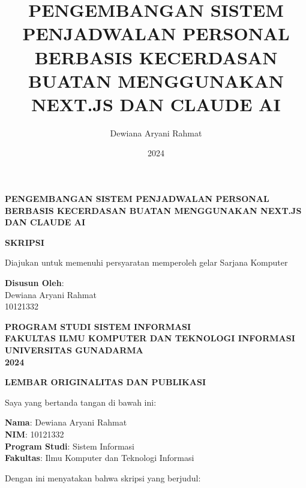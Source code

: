 \documentclass[12pt,a4paper,oneside]{report}
\title{PENGEMBANGAN SISTEM PENJADWALAN PERSONAL BERBASIS KECERDASAN BUATAN MENGGUNAKAN NEXT.JS DAN CLAUDE AI}
\author{Dewiana Aryani Rahmat}
\date{2024}
\begin{document}
\begin{titlepage}
\centering
\vspace*{2cm}

{\LARGE\bfseries PENGEMBANGAN SISTEM PENJADWALAN PERSONAL BERBASIS KECERDASAN BUATAN MENGGUNAKAN NEXT.JS DAN CLAUDE AI}

\vspace{2cm}

{\Large\bfseries SKRIPSI}

\vspace{1cm}

Diajukan untuk memenuhi persyaratan memperoleh gelar Sarjana Komputer

\vspace{3cm}

{\Large
\textbf{Disusun Oleh}:\\
\vspace{0.5cm}
Dewiana Aryani Rahmat\\
10121332
}

\vfill

{\Large
\textbf{PROGRAM STUDI SISTEM INFORMASI}\\
\textbf{FAKULTAS ILMU KOMPUTER DAN TEKNOLOGI INFORMASI}\\
\textbf{UNIVERSITAS GUNADARMA}\\
\textbf{2024}
}

\end{titlepage}

\newpage
\thispagestyle{empty}
\begin{center}
{\Large\bfseries LEMBAR ORIGINALITAS DAN PUBLIKASI}
\end{center}

\vspace{2cm}

\noindent
Saya yang bertanda tangan di bawah ini:

\vspace{0.5cm}
\noindent
\textbf{Nama}: Dewiana Aryani Rahmat\\
\textbf{NIM}: 10121332\\
\textbf{Program Studi}: Sistem Informasi\\
\textbf{Fakultas}: Ilmu Komputer dan Teknologi Informasi

\vspace{1cm}

\noindent
Dengan ini menyatakan bahwa skripsi yang berjudul:
\end{document}
